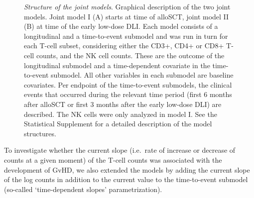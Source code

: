\documentclass[
  letterpaper,
  paper=240mm:170mm,
  twoside=true,
  open=right,
  fontsize=10pt,
  pagesize=false,
  BCOR=15mm,
  DIV=14,
  headinclude=true,
  footinclude=false,
  headsepline=on]{scrbook}
\begin{document}
\begin{figure}


\caption{\label{fig-DLI-one}\emph{Structure of the joint models}.
Graphical description of the two joint models. Joint model I (A) starts
at time of alloSCT, joint model II (B) at time of the early low-dose
DLI. Each model consists of a longitudinal and a time-to-event submodel
and was run in turn for each T-cell subset, considering either the CD3+,
CD4+ or CD8+ T-cell counts, and the NK cell counts. These are the
outcome of the longitudinal submodel and a time-dependent covariate in
the time-to-event submodel. All other variables in each submodel are
baseline covariates. Per endpoint of the time-to-event submodels, the
clinical events that occurred during the relevant time period (first 6
months after alloSCT or first 3 months after the early low-dose DLI) are
described. The NK cells were only analyzed in model I. See the
Statistical Supplement for a detailed description of the model
structures.}

\end{figure}%

To investigate whether the current slope (i.e.~rate of increase or
decrease of counts at a given moment) of the T-cell counts was
associated with the development of GvHD, we also extended the models by
adding the current slope of the log counts in addition to the current
value to the time-to-event submodel (so-called `time-dependent slopes'
parametrization).
\end{document}
